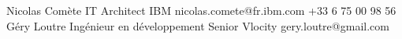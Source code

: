 %
%
%


\begin{referees}
		{Nicolas Comète}
		{IT Architect}
		{IBM}
		{nicolas.comete@fr.ibm.com}
		{+33 6 75 00 98 56}
		{Géry Loutre}
		{Ingénieur en développement Senior}
		{Vlocity}
		{gery.loutre@gmail.com}
		{}
\end{referees}